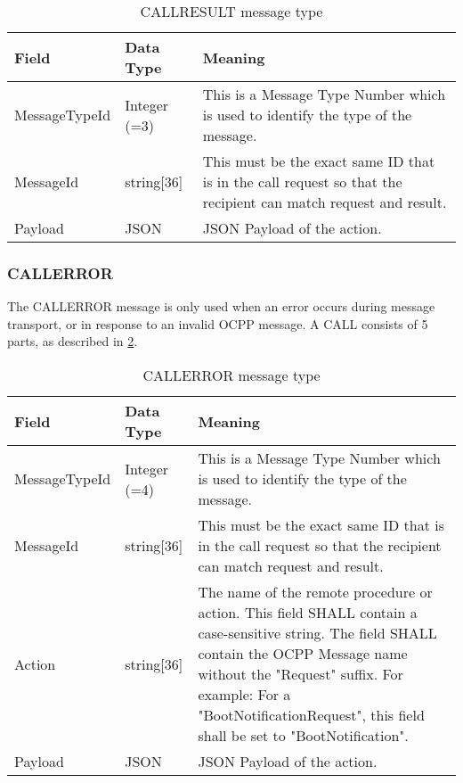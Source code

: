 \documentclass[12pt,openany,a4paper]{book}
\begin{document}
\begin{table}[H]
\begin{tabular}{ |p{3cm}|p{2.5cm}|p{9cm}| }
 \hline
\textbf{Field} & \textbf{Data Type} & \textbf{Meaning}
\\
 \hline MessageTypeId & Integer (=3) & This is a Message Type Number which is used to identify the type of the message.\\
 \hline MessageId & string[36] & This must be the exact same ID that is in the call request so that the recipient can match request and result.\\
 \hline Payload & JSON & JSON Payload of the action.\\
 \hline
\end{tabular}
\caption{CALLRESULT message type \cite{ocpp4}}
\label{tab:CALLRESULT}
\end{table}


\subsubsection{CALLERROR}
The CALLERROR message is only used when an error occurs during message transport, or in response to an invalid OCPP message. A CALL consists of 5 parts, as described in \ref{tab:CALLERROR}. 
\begin{table}[htp]
\begin{tabular}{ |p{3cm}|p{2.5cm}|p{9cm}| }
 \hline
\textbf{Field} & \textbf{Data Type} & \textbf{Meaning}
\\
 \hline MessageTypeId & Integer (=4)& This is a Message Type Number which is used to identify the type of the message.\\
 \hline MessageId & string[36] & This must be the exact same ID that is in the call request so that the recipient can match request and result.\\
 \hline Action & string[36] & The name of the remote procedure or action. This field SHALL contain a case-sensitive string.
The field SHALL contain the OCPP Message name without the "Request" suffix. For example: For
a "BootNotificationRequest", this field shall be set to "BootNotification".\\
 \hline Payload & JSON & JSON Payload of the action.\\
 \hline
\end{tabular}
\caption{CALLERROR message type \cite{ocpp4}}
\label{tab:CALLERROR}
\end{table}
\end{document}
